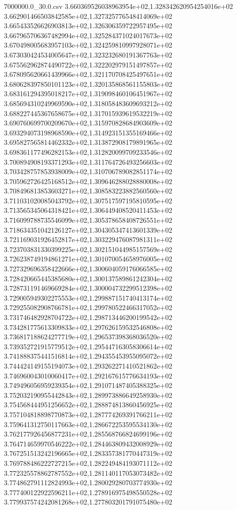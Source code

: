 \begin{filecontents*}{7000000.0_30.0.csv}
3.660369526038963954e+02,1.328342620954254016e+02
3.662901466503842585e+02,1.327325776548414069e+02
3.665433526626903813e+02,1.326306359722957495e+02
3.667965706367482994e+02,1.325284371024017673e+02
3.670498005683957103e+02,1.324259810997928071e+02
3.673030424534005647e+02,1.323232680191367763e+02
3.675562962874490722e+02,1.322202979151497857e+02
3.678095620661439966e+02,1.321170708425497651e+02
3.680628397850101123e+02,1.320135868561155803e+02
3.683161294395018217e+02,1.319098460106451967e+02
3.685694310249969590e+02,1.318058483609693212e+02
3.688227445367658675e+02,1.317015939619532219e+02
3.690760699700209670e+02,1.315970828684903609e+02
3.693294073198968590e+02,1.314923151355169466e+02
3.695827565814462332e+02,1.313872908179891965e+02
3.698361177496282153e+02,1.312820099709233546e+02
3.700894908193371293e+02,1.311764726493256603e+02
3.703428757853938009e+02,1.310706789082851174e+02
3.705962726425168512e+02,1.309646288028880008e+02
3.708496813853603271e+02,1.308583223882560560e+02
3.711031020085043792e+02,1.307517597195810595e+02
3.713565345064318421e+02,1.306449408520411453e+02
3.716099788735546099e+02,1.305378658408726551e+02
3.718634351042126127e+02,1.304305347413601339e+02
3.721169031926452817e+02,1.303229476087981311e+02
3.723703831330399225e+02,1.302151044985157569e+02
3.726238749194861271e+02,1.301070054658976005e+02
3.727329696358422666e+02,1.300604059176066585e+02
3.728420665445385680e+02,1.300137589861242304e+02
3.728731191469669284e+02,1.300004732299512398e+02
3.729005949302275553e+02,1.299887151740413174e+02
3.729255082908766781e+02,1.299780522466317052e+02
3.731746482928704722e+02,1.298713446200199542e+02
3.734281775613309833e+02,1.297626159532546808e+02
3.736817188624277719e+02,1.296537398368036520e+02
3.739352721915779512e+02,1.295447163058306614e+02
3.741888375441516814e+02,1.294355453955095072e+02
3.744424149155194073e+02,1.293262271410521862e+02
3.746960043010060417e+02,1.292167615776634193e+02
3.749496056959239354e+02,1.291071487405388325e+02
3.752032190955442843e+02,1.289973886649258930e+02
3.754568444951256652e+02,1.288874813860456925e+02
3.757104818898770873e+02,1.287774269391766211e+02
3.759641312750117663e+02,1.286672253595534130e+02
3.762177926456877231e+02,1.285568766824699196e+02
3.764714659970546222e+02,1.284463809432008929e+02
3.767251513242196665e+02,1.283357381770447319e+02
3.769788486222727215e+02,1.282249484193071112e+02
3.772325578862787552e+02,1.281140117053073482e+02
3.774862791112824993e+02,1.280029280703774930e+02
3.777400122922596211e+02,1.278916975498550528e+02
3.779937574242081268e+02,1.277803201791075480e+02

\end{filecontents*}
